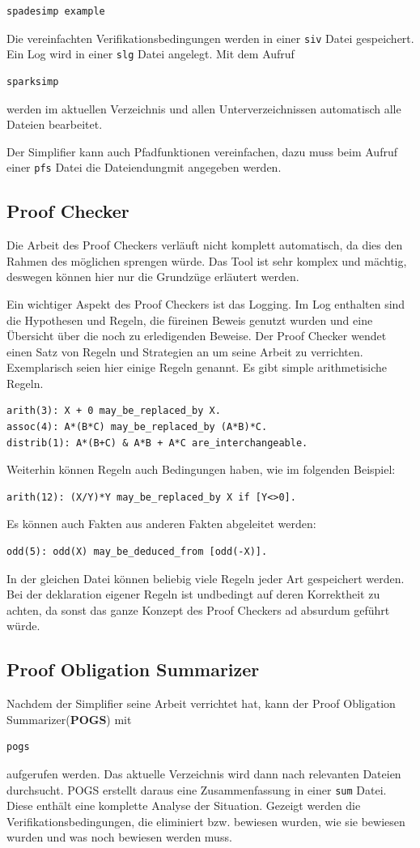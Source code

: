 \begin{verbatim}
spadesimp example
\end{verbatim}

Die vereinfachten Verifikationsbedingungen werden in einer \texttt{siv} Datei gespeichert. Ein Log wird in einer \texttt{slg} Datei angelegt.
Mit dem Aufruf
\begin{verbatim}
sparksimp
\end{verbatim}
werden im aktuellen Verzeichnis und allen Unterverzeichnissen automatisch alle Dateien bearbeitet.

Der Simplifier kann auch Pfadfunktionen vereinfachen, dazu muss beim Aufruf einer \texttt{pfs} Datei die Dateiendungmit angegeben werden. 

\subsection{Proof Checker}
Die Arbeit des Proof Checkers verläuft nicht komplett automatisch, da dies den Rahmen des möglichen sprengen würde. Das Tool ist sehr komplex und mächtig, deswegen können hier nur die Grundzüge erläutert werden.

Ein wichtiger Aspekt des Proof Checkers ist das Logging. Im Log enthalten sind die Hypothesen und Regeln, die füreinen Beweis genutzt wurden und eine Übersicht über die noch zu erledigenden Beweise.
Der Proof Checker wendet einen Satz von Regeln und Strategien an um seine Arbeit zu verrichten. Exemplarisch seien hier einige Regeln genannt. Es gibt simple arithmetisiche Regeln.
\begin{verbatim}
arith(3): X + 0 may_be_replaced_by X.
assoc(4): A*(B*C) may_be_replaced_by (A*B)*C.
distrib(1): A*(B+C) & A*B + A*C are_interchangeable.
\end{verbatim} 
Weiterhin können Regeln auch Bedingungen haben, wie im folgenden Beispiel:
\begin{verbatim}
arith(12): (X/Y)*Y may_be_replaced_by X if [Y<>0].
\end{verbatim}
Es können auch Fakten aus anderen Fakten abgeleitet werden:
\begin{verbatim}
odd(5): odd(X) may_be_deduced_from [odd(-X)].
\end{verbatim}

In der gleichen Datei können beliebig viele Regeln jeder Art gespeichert werden.
Bei der deklaration eigener Regeln ist undbedingt auf deren Korrektheit zu achten, da sonst das ganze Konzept des Proof Checkers ad absurdum geführt würde.

\subsection{Proof Obligation Summarizer}
Nachdem der Simplifier seine Arbeit verrichtet hat, kann der Proof Obligation Summarizer(\textbf{POGS}) mit
\begin{verbatim}
pogs
\end{verbatim}
aufgerufen werden. Das aktuelle Verzeichnis wird dann nach relevanten Dateien durchsucht. POGS erstellt daraus eine Zusammenfassung in einer \texttt{sum} Datei. Diese enthält eine komplette Analyse der Situation. Gezeigt werden die Verifikationsbedingungen, die eliminiert bzw. bewiesen wurden, wie sie bewiesen wurden und was noch bewiesen werden muss.